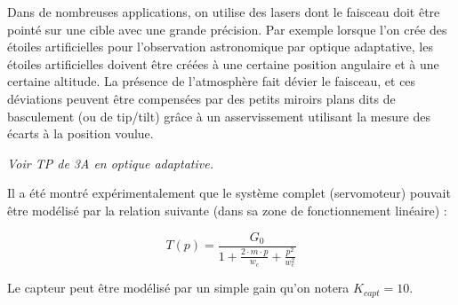 Dans de nombreuses applications, on utilise des lasers dont le faisceau doit être pointé sur une cible avec une grande précision. Par exemple lorsque l'on crée des étoiles artificielles pour l'observation astronomique par optique adaptative, les étoiles artificielles doivent être créées à une certaine position angulaire et à une certaine altitude. La présence de l'atmosphère fait dévier le faisceau, et ces déviations peuvent être compensées par des petits miroirs plans dits de basculement (ou de tip/tilt) grâce à un asservissement utilisant la mesure des écarts à la position voulue.

\textit{Voir TP de 3A en optique adaptative.}



Il a été montré expérimentalement que le système complet (servomoteur) pouvait être modélisé par la relation suivante (dans sa zone de fonctionnement linéaire) :

$$T(p) = \frac{G_0}{1 + \frac{2 \cdot m \cdot p}{w_c} + \frac{p^2}{w_c^2}}$$

Le capteur peut être modélisé par un simple gain qu'on notera $K_{capt} = 10$.


